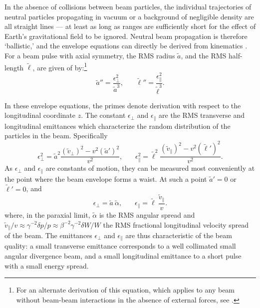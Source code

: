 \documentclass [12pt,a4paper,     ]{report} %
\begin{document}
In the absence of collisions between beam particles, the individual trajectories of neutral particles propagating in vacuum or a background of negligible density are all straight lines --- at least as long as ranges are sufficiently short for the effect of Earth's gravitational field to be ignored.   Neutral beam propagation is therefore `ballistic,' and the envelope equations can directly be derived from kinematics \cite{EMIGH1972-}.  For a beam pulse with axial symmetry, the RMS radius $\tilde{a}$, and the RMS half-length  $\tilde{\ell}$, are given of  by:\footnote{For an alternate derivation of this equation, which applies to any beam without beam-beam interactions in the absence of external forces, see \cite[p.187]{LAWSO1977-}.}
%
\begin{equation}\label{neu:1} %
      \tilde{a}''    = \frac{\epsilon_{\perp}^2}{\tilde{a   }^3}, ~~~~  ~~~~
      \tilde{\ell}'' = \frac{\epsilon_{\|}^2}{\tilde{\ell}^3}.
\end{equation}
%

	In these envelope equations, the primes denote derivation with respect to the longitudinal coordinate $z$.  The constant $\epsilon_{\perp}$ and $\epsilon_{\|}$ are the RMS transverse and longitudinal emittances which characterize the random distribution of the particles in the beam.  Specifically
%
\begin{equation}\label{neu:2} %
 \epsilon_{\perp}^2 = \tilde{a}^2 \frac{(\tilde{v}_{\perp})^2 - 
                                   v^2(\tilde{a}')^2}{v^2},  ~~~~  ~~~~
 \epsilon_{\|}^2 = \tilde{\ell}^2 \frac{(\tilde{v}_{\|})^2 - 
                                      v^2(\tilde{\ell}')^2}{v^2}.
\end{equation}
%
As $\epsilon_{\perp}$ and $\epsilon_{\|}$ are constants of motion, they can be measured most conveniently at the point where the beam envelope forms a waist.  At such a point $\tilde{a}'=0$ or $\tilde{\ell}'=0$, and
%
\begin{equation}\label{neu:3} %
    \epsilon_{\perp} = \tilde{a} ~ \tilde{\alpha},  ~~~~  ~~~~
    \epsilon_{\|} = \tilde{\ell} ~ \frac{\tilde{v}_{\|}}{v}.
\end{equation}
%
where, in the paraxial limit, $\tilde{\alpha}$ is the RMS angular spread and $\tilde{v}_{\|}/v \approx \gamma^{-2} \delta  p/p \approx \beta^{-2}\gamma^{-2} \delta W/W$ the RMS fractional longitudinal velocity spread of the beam.  The emittances $\epsilon_{\perp}$ and $\epsilon_{\|}$ are thus characteristic of the beam quality: a small transverse emittance corresponds to a well collimated small angular divergence beam, and a small longitudinal emittance to a short pulse with a small energy spread.
\end{document}
